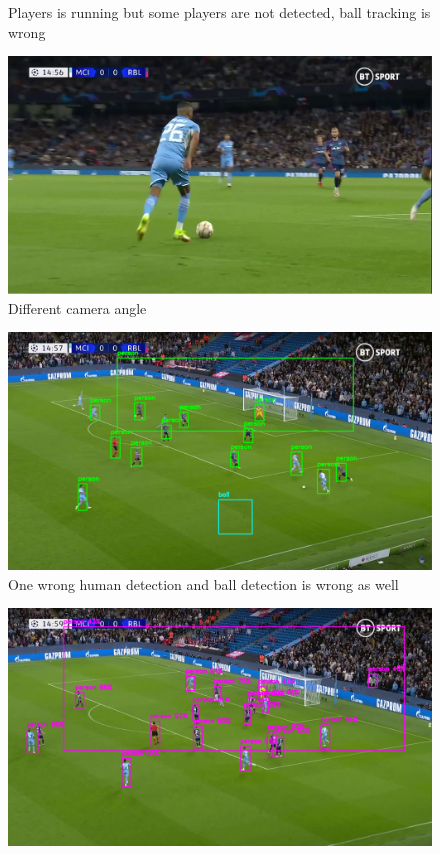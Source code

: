 \documentclass[
    11pt,
    oneside
]{report}
\begin{document}
\begin{appendices}
\begin{figure}[H]
    \caption{Players is running but some players are not detected, ball tracking is wrong}
    \label{img:9}
\end{figure}
\begin{figure}[H]
    \includegraphics[keepaspectratio, width=\columnwidth]{Screenshot_2022-03-03_21-39-53.png}
    \caption{Different camera angle}
    \label{img:10}
\end{figure}
\begin{figure}[H]
    \includegraphics[keepaspectratio, width=\columnwidth]{Screenshot_2022-03-03_23-06-43.png}
    \caption{One wrong human detection and ball detection is wrong as well}
    \label{img:11}
\end{figure}
\begin{figure}[H]
    \includegraphics[keepaspectratio, width=\columnwidth]{Screenshot_2022-03-03_23-08-00.png}

\end{figure}
\end{appendices}
\end{document}
